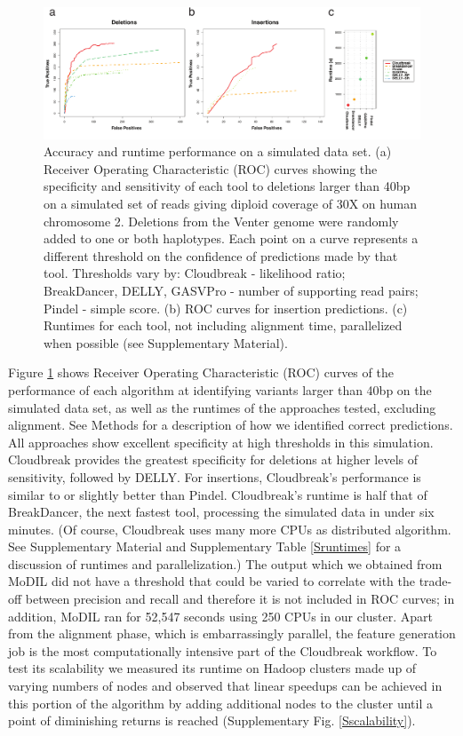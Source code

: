 \documentclass[11pt]{article}
\begin{document}
\begin{figure}
\centering
\includegraphics[width=1\textwidth]{../figures/chr2_rocs_runtimes_journal.pdf}
\caption{Accuracy and runtime performance on a simulated data set. (a) Receiver Operating Characteristic (ROC) curves showing the specificity and sensitivity of each tool to deletions larger than 40bp on a simulated set of reads giving diploid coverage of 30X on human chromosome 2. Deletions from the Venter genome were randomly added to one or both haplotypes. Each point on a curve represents a different threshold on the confidence of predictions made by that tool. Thresholds vary by: Cloudbreak - likelihood ratio; BreakDancer, DELLY, GASVPro - number of supporting read pairs; Pindel - simple score. (b) ROC curves for insertion predictions. (c) Runtimes for each tool, not including alignment time, parallelized when possible (see Supplementary Material).}
\label{chr2CombinedRoc}
\end{figure}

Figure \ref{chr2CombinedRoc} shows Receiver Operating Characteristic (ROC) curves of the performance of each algorithm at identifying variants larger than 40bp on the simulated data set, as well as the runtimes of the approaches tested, excluding alignment. See Methods for a description of how we identified correct predictions. All approaches show excellent specificity at high thresholds in this simulation. Cloudbreak provides the greatest specificity for deletions at higher levels of sensitivity, followed by DELLY. For insertions, Cloudbreak's performance is similar to or slightly better than Pindel. Cloudbreak's runtime is half that of BreakDancer, the next fastest tool, processing the simulated data in under six minutes. (Of course, Cloudbreak uses many more CPUs as distributed algorithm. See Supplementary Material and Supplementary Table \ref{Sruntimes} for a discussion of runtimes and parallelization.) The output which we obtained from MoDIL did not have a threshold that could be varied to correlate with the trade-off between precision and recall and therefore it is not included in ROC curves; in addition, MoDIL ran for 52,547 seconds using 250 CPUs in our cluster. Apart from the alignment phase, which is embarrassingly parallel, the feature generation job is the most computationally intensive part of the Cloudbreak workflow. To test its scalability we measured its runtime on Hadoop clusters made up of varying numbers of nodes and observed that linear speedups can be achieved in this portion of the algorithm by adding additional nodes to the cluster until a point of diminishing returns is reached (Supplementary Fig. \ref{Sscalability}).
\end{document}
